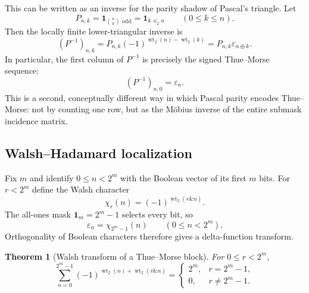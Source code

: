 \documentclass[11pt,oneside]{article}
\newtheorem{theorem}{Theorem}[section]
\theoremstyle{definition}
\theoremstyle{remark}
\newcommand{\wt}{\operatorname{wt}_2}
\newcommand{\ind}{\mathbf 1}
\newcommand{\xor}{\mathbin{\oplus}}
\newcommand{\preceqbits}{\mathrel{\preccurlyeq_2}}
\newcommand{\bitand}{\mathbin{\&}}
\begin{document}
This can be written as an inverse for the parity shadow of Pascal's triangle.
Let
\begin{equation}
  P_{n,k}=\ind_{\binom nk\text{ odd}}
  =\ind_{k\preceqbits n}\qquad(0\le k\le n).               \label{eq:pascal-parity-matrix}
\end{equation}
Then the locally finite lower-triangular inverse is
\begin{equation}
  \boxed{\displaystyle
  (P^{-1})_{n,k}=P_{n,k}(-1)^{\wt(n)-\wt(k)}
  =P_{n,k}\varepsilon_{n\xor k}.}                          \label{eq:pascal-parity-inverse}
\end{equation}
In particular, the first column of $P^{-1}$ is precisely the signed
Thue--Morse sequence:
\begin{equation}
  (P^{-1})_{n,0}=\varepsilon_n.                             \label{eq:pascal-inverse-first-column}
\end{equation}
This is a second, conceptually different way in which Pascal parity encodes
Thue--Morse: not by counting one row, but as the Möbius inverse of the entire
submask incidence matrix.

\subsection{Walsh--Hadamard localization}

Fix $m$ and identify $0\le n<2^m$ with the Boolean vector of its first $m$ bits.
For $r<2^m$ define the Walsh character
\begin{equation}
  \chi_r(n)=(-1)^{\wt(r\bitand n)}.                         \label{eq:walsh-character}
\end{equation}
The all-ones mask $\mathbf1_m=2^m-1$ selects every bit, so
\begin{equation}
  \varepsilon_n=\chi_{2^m-1}(n)\qquad(0\le n<2^m).         \label{eq:epsilon-walsh}
\end{equation}
Orthogonality of Boolean characters therefore gives a delta-function transform.

\begin{theorem}[Walsh transform of a Thue--Morse block]
\label{thm:walsh-transform}
For $0\le r<2^m$,
\begin{equation}
 \boxed{\displaystyle
 \sum_{n=0}^{2^m-1}
 (-1)^{\wt(n)+\wt(r\bitand n)}
 =
 \begin{cases}
   2^m,&r=2^m-1,\\
   0,&r\ne2^m-1.
 \end{cases}}                                               \label{eq:walsh-transform}
\end{equation}
\end{theorem}
\end{document}
